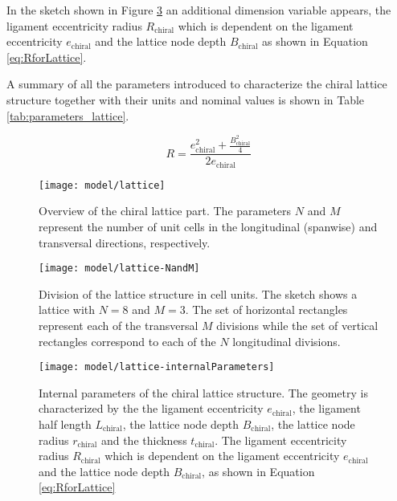     In the sketch shown in Figure \ref{fig:lattice-internalParameters} an additional dimension variable appears, the ligament eccentricity radius $R_{\mathrm{chiral}}$ which is dependent on the ligament eccentricity $e_{\mathrm{chiral}}$ and the lattice node depth $B_{\mathrm{chiral}}$ as shown in Equation \ref{eq:RforLattice}.

    A summary of all the parameters introduced to characterize the chiral lattice structure together with their units and nominal values is shown in Table \ref{tab:parameters_lattice}.

    \begin{equation}\label{eq:RforLattice}
      R = \frac{e_{\mathrm{chiral}}^2 + \frac{B_{\mathrm{chiral}}^2}{4}}{2e_{\mathrm{chiral}}}
    \end{equation}

    \begin{figure}[!htpb]
      \centering
      \texttt{[image: model/lattice]}
      \caption[Overview of the chiral lattice part]{Overview of the chiral lattice part. The parameters $N$ and $M$ represent the number of unit cells in the longitudinal (spanwise) and transversal directions, respectively.}\label{fig:lattice}
    \end{figure}

    \begin{figure}[!htpb]
      \centering
      \texttt{[image: model/lattice-NandM]}
      \caption[Division of the lattice structure in cell units]{Division of the lattice structure in cell units. The sketch shows a lattice with $N = 8$ and $M = 3$. The set of horizontal rectangles represent each of the transversal $M$ divisions while the set of vertical rectangles correspond to each of the $N$ longitudinal divisions.}\label{fig:lattice-NandM}
    \end{figure}

    \begin{figure}[!htpb]
      \centering
      \texttt{[image: model/lattice-internalParameters]}
      \caption[Internal parameters of the chiral lattice structure]{Internal parameters of the chiral lattice structure. The geometry is characterized by the the ligament eccentricity $e_{\mathrm{chiral}}$, the ligament half length $L_{\mathrm{chiral}}$, the lattice node depth $B_{\mathrm{chiral}}$, the lattice node radius $r_{\mathrm{chiral}}$ and the thickness $t_{\mathrm{chiral}}$. The ligament eccentricity radius $R_{\mathrm{chiral}}$ which is dependent on the ligament eccentricity $e_{\mathrm{chiral}}$ and the lattice node depth $B_{\mathrm{chiral}}$, as shown in Equation \ref{eq:RforLattice}}\label{fig:lattice-internalParameters}
    \end{figure}


